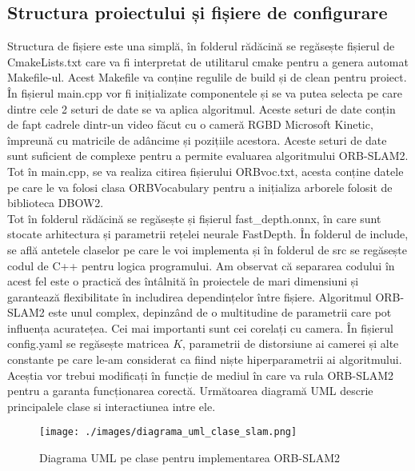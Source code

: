 \documentclass[12pt,a4paper]{report}
\begin{document}
\subsection{Structura proiectului și fișiere de configurare}
Structura de fișiere este una simplă, în folderul rădăcină se regăsește fișierul de 
CmakeLists.txt care va fi interpretat de utilitarul cmake pentru a genera automat Makefile-ul. 
Acest Makefile va conține regulile de build și de clean pentru proiect. În fișierul main.cpp
vor fi inițializate componentele și se va putea selecta pe care dintre cele 2 seturi
de date se va aplica algoritmul. Aceste seturi de date conțin de fapt cadrele dintr-un video 
făcut cu o cameră RGBD Microsoft Kinetic, împreună cu matricile de adâncime și pozițiile acestora.
Aceste seturi de date sunt suficient de complexe pentru a permite evaluarea algoritmului ORB-SLAM2.
Tot în main.cpp, se va realiza citirea fișierului ORBvoc.txt, acesta conține datele pe care le va
folosi clasa ORBVocabulary pentru a inițializa arborele folosit de biblioteca DBOW2. \\
Tot în folderul rădăcină se regăsește și fișierul fast\_depth.onnx, în care sunt stocate 
arhitectura și parametrii rețelei neurale FastDepth. În folderul de include, se află antetele claselor
pe care le voi implementa și în folderul de src se regăsește codul de C++ pentru logica programului.
Am observat că separarea codului în acest fel este o practică des întâlnită în proiectele de mari
dimensiuni și garantează flexibilitate în includirea dependințelor între fișiere. Algoritmul 
ORB-SLAM2 este unul complex, depinzând de o multitudine de parametrii care pot influența acuratețea.
Cei mai importanti sunt cei corelați cu camera. În fișierul config.yaml se regăsește matricea \(K\), 
parametrii de distorsiune ai camerei și alte constante pe care le-am considerat ca fiind niște
hiperparametrii ai algoritmului. Aceștia vor trebui modificați în funcție de mediul în care va 
rula ORB-SLAM2 pentru a garanta funcționarea corectă. Următoarea diagramă UML descrie principalele 
clase si interactiunea intre ele.
\begin{figure}[htbp] 
  \centering
  \texttt{[image: ./images/diagrama\_uml\_clase\_slam.png]}
  \caption{Diagrama UML pe clase pentru implementarea ORB-SLAM2}\label{fig:diagrama_clase}
\end{figure}
\end{document}
